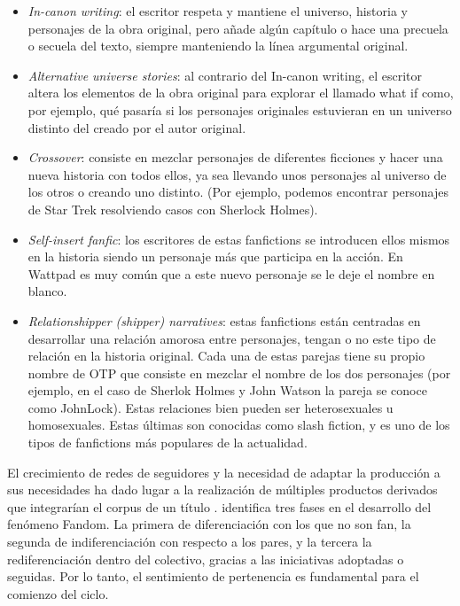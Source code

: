 \documentclass[spanish]{textolivre}
\begin{document}
\begin{itemize}
    \item \textit{In-canon writing}: el escritor respeta y mantiene el universo, historia y personajes de la obra original, pero añade algún capítulo o hace una precuela o secuela del texto, siempre manteniendo la línea argumental original.
    \item \textit{Alternative universe stories}: al contrario del In-canon writing, el escritor altera los elementos de la obra original para explorar el llamado what if como, por ejemplo, qué pasaría si los personajes originales estuvieran en un universo distinto del creado por el autor original.
    \item \textit{Crossover}: consiste en mezclar personajes de diferentes ficciones y hacer una nueva historia con todos ellos, ya sea llevando unos personajes al universo de los otros o creando uno distinto. (Por ejemplo, podemos encontrar personajes de Star Trek resolviendo casos con Sherlock Holmes).
    \item \textit{Self-insert fanfic}: los escritores de estas fanfictions se introducen ellos mismos en la historia siendo un personaje más que participa en la acción. En Wattpad es muy común que a este nuevo personaje se le deje el nombre en blanco.
    \item \textit{Relationshipper (shipper) narratives}: estas fanfictions están centradas en desarrollar una relación amorosa entre personajes, tengan o no este tipo de relación en la historia original. Cada una de estas parejas tiene su propio nombre de OTP que consiste en mezclar el nombre de los dos personajes (por ejemplo, en el caso de Sherlok Holmes y John Watson la pareja se conoce como JohnLock). Estas relaciones bien pueden ser heterosexuales u homosexuales. Estas últimas son conocidas como slash fiction, y es uno de los tipos de fanfictions más populares de la actualidad.
\end{itemize}

El crecimiento de redes de seguidores y la necesidad de adaptar la producción a sus necesidades ha dado lugar a la realización de múltiples productos derivados que integrarían el corpus de un título \cite{jacobs_live_2018}. \textcite{peyron_fandom_2018} identifica tres fases en el desarrollo del fenómeno Fandom. La primera de diferenciación con los que no son fan, la segunda de indiferenciación con respecto a los pares, y la tercera la rediferenciación dentro del colectivo, gracias a las iniciativas adoptadas o seguidas. Por lo tanto, el sentimiento de pertenencia es fundamental para el comienzo del ciclo. 
\end{document}
